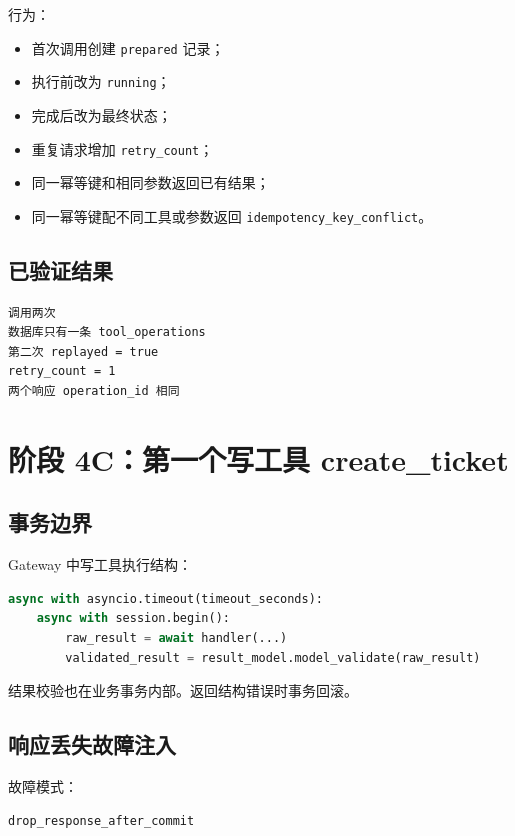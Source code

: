 \documentclass[11pt,a4paper]{ctexart}
\begin{document}
行为：

\begin{itemize}[leftmargin=2em]
  \item 首次调用创建 \texttt{prepared} 记录；
  \item 执行前改为 \texttt{running}；
  \item 完成后改为最终状态；
  \item 重复请求增加 \texttt{retry\_count}；
  \item 同一幂等键和相同参数返回已有结果；
  \item 同一幂等键配不同工具或参数返回
        \texttt{idempotency\_key\_conflict}。
\end{itemize}

\subsection{已验证结果}

\begin{lstlisting}
调用两次
数据库只有一条 tool_operations
第二次 replayed = true
retry_count = 1
两个响应 operation_id 相同
\end{lstlisting}

\section{阶段 4C：第一个写工具 create\_ticket}

\subsection{事务边界}

Gateway 中写工具执行结构：

\begin{lstlisting}[language=Python]
async with asyncio.timeout(timeout_seconds):
    async with session.begin():
        raw_result = await handler(...)
        validated_result = result_model.model_validate(raw_result)
\end{lstlisting}

结果校验也在业务事务内部。返回结构错误时事务回滚。

\subsection{响应丢失故障注入}

故障模式：

\begin{lstlisting}
drop_response_after_commit
\end{lstlisting}
\end{document}
